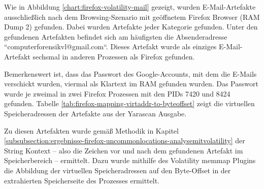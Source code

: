Wie in Abbildung \ref{chart:firefox-volatility-mail} gezeigt, wurden E-Mail-Artefakte ausschließlich nach dem Browsing-Szenario mit geöffnetem Firefox Browser (RAM Dump 2) gefunden. Dabei wurden Artefakte jeder Kategorie gefunden.
Unter den gefundenen Artefakten befindet sich am häufigsten die Absenderadresse ``computerforensikvl@gmail.com``. Dieses Artefakt wurde als einziges E-Mail-Artefakt sechsmal in anderen Prozessen als Firefox gefunden.

Bemerkenswert ist, dass das Passwort des Google-Accounts, mit dem die E-Mails verschickt wurden, viermal als Klartext im RAM gefunden wurden. Das Passwort wurde je zweimal in zwei Firefox Prozessen mit den PIDs 7420 und 8424 gefunden. Tabelle \ref{tab:firefox-mapping-virtaddr-to-byteoffset} zeigt die virtuellen Speicheradressen der Artefakte aus der Yarascan Ausgabe.
\begin{table}[h!]
\caption{Firefox: Abbildung der virtellen Speicheradressen der gefundenen Strings auf Byte-Offsets der entsprechenden Speicherseiten}
\label{tab:firefox-mapping-virtaddr-to-byteoffset}
\end{table}

Zu diesen Artefakten wurde gemäß Methodik in Kapitel \ref{subsubsection:ergebnisse-firefox-uncommonlocations-analysemitvolatility} der String Kontext -- also die Zeichen vor und nach dem gefundenen Artefakt im Speicherbereich -- ermittelt. Dazu wurde mithilfe des Volatility memmap Plugins die Abbildung der virtuellen Speicheradressen auf den Byte-Offset in der extrahierten Speicherseite des Prozesses ermittelt. 

